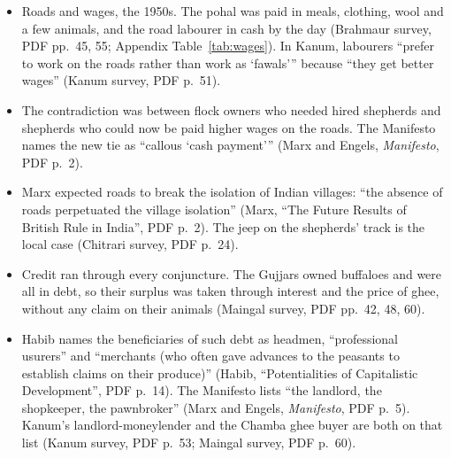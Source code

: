 \documentclass[11pt,a4paper]{article}
\newcommand{\cit}[1]{{\small(#1)}}
\newcommand{\Habib}{Habib, \enquote{Potentialities of Capitalistic Development}}
\begin{document}
\begin{itemize}
  distinction between right holders, whose rights came from the rajas, and
  others, and charged right holders less for buffaloes \cit{Devi-Kothi survey,
  PDF pp.~47, 49, image-read}. The slides: \enquote{Colonial Relations Can Continue Even After
  Political Independence} \cit{Alam, \enquote{Marxist History} slides, PDF
  p.~17}.
\item Roads and wages, the 1950s. The pohal was paid in meals, clothing, wool
  and a few animals, and the road labourer in cash by the day \cit{Brahmaur
  survey, PDF pp.~45, 55; Appendix Table~\ref{tab:wages}}. In Kanum, labourers \enquote{prefer to work on the
  roads rather than work as `fawals'} because \enquote{they get better wages}
  \cit{Kanum survey, PDF p.~51}.
\item The contradiction was between flock owners who needed hired shepherds and
  shepherds who could now be paid higher wages on the roads. The Manifesto names the new tie
  as \enquote{callous `cash payment'} \cit{Marx and Engels, \emph{Manifesto}, PDF
  p.~2}.
\item Marx expected roads to break the isolation of Indian villages:
  \enquote{the absence of roads perpetuated the village isolation} \cit{Marx,
  \enquote{The Future Results of British Rule in India}, PDF p.~2}. The jeep on
  the shepherds' track is the local case \cit{Chitrari survey, PDF p.~24}.
\item Credit ran through every conjuncture. The Gujjars owned buffaloes and were
  all in debt, so their surplus was taken through interest and the price of
  ghee, without any claim on their animals \cit{Maingal survey, PDF pp.~42,
  48, 60}.
\item Habib names the beneficiaries of such debt as headmen, \enquote{professional
  usurers} and \enquote{merchants (who often gave advances to the peasants to
  establish claims on their produce)} \cit{\Habib, PDF p.~14}. The Manifesto
  lists \enquote{the landlord, the shopkeeper, the pawnbroker} \cit{Marx and
  Engels, \emph{Manifesto}, PDF p.~5}. Kanum's landlord-moneylender and the
  Chamba ghee buyer are both on that list \cit{Kanum survey, PDF p.~53;
  Maingal survey, PDF p.~60}.
\end{itemize}
\end{document}
